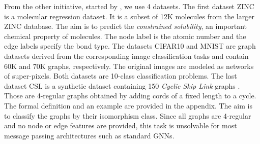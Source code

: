 \documentclass{scrartcl} \usepackage[dvipsnames]{xcolor}
\begin{document}
From the other initiative, started by \citet{dwivedi2020benchmarkgnns}, we use 4 datasets.
The first dataset ZINC is a molecular regression dataset.
It is a subset of 12K molecules from the larger ZINC database.
The aim is to predict the \emph{constrained solubility}, an important chemical property of molecules.
The node label is the atomic number and the edge labels specify the bond type.
The datasets CIFAR10 and MNIST are graph datasets derived from the corresponding image classification tasks and contain 60K and 70K graphs, respectively.
The original images are modeled as networks of super-pixels.
Both datasets are 10-class classification problems.
The last dataset CSL is a synthetic dataset containing 150 \emph{Cyclic Skip Link} graphs \citep{murphy2019relational}.
Those are 4-regular graphs obtained by adding cords of a fixed length to a cycle.
The formal definition and an example are provided in the appendix.
The aim is to classify the graphs by their isomorphism class.
Since all graphs are 4-regular and no node or edge features are provided, this task is unsolvable for most message passing architectures such as standard GNNs.
\end{document}

